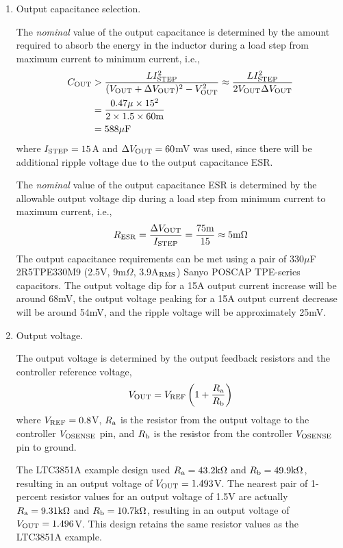 \begin{enumerate}
\item Output capacitance selection.

The {\em nominal} value of the output capacitance is determined by 
the amount required to absorb the energy in the inductor during a
load step from maximum current to minimum current, i.e.,
%
\begin{equation}
\begin{split}
C_{\rm OUT} &> \frac{LI_{\rm STEP}^2}
{(V_{\rm OUT} + \Delta V_{\rm OUT})^2 - V_{\rm OUT}^2} 
\approx \frac{LI_{\rm STEP}^2}{2V_{\rm OUT}\Delta V_{\rm OUT}}\\
&= \frac{0.47\mu\times 15^2}{2\times1.5\times60\text{m}}\\
&= 588\mu\text{F}
\end{split}
\end{equation}
%
where $I_{\rm STEP}=15$A and $\Delta V_{\rm OUT} = 60$mV was
used, since there will be additional ripple voltage due to 
the output capacitance ESR.

The {\em nominal} value of the output capacitance ESR is determined by
the allowable output voltage dip during a load step from minimum current
to maximum current, i.e.,
%
\begin{equation}
R_{\rm ESR} = \frac{\Delta V_{\rm OUT}}{I_{\rm STEP}} = 
\frac{75\text{m}}{15} \approx 5\text{m}\Omega
\end{equation}
%
The output capacitance requirements can be met using a pair
of 330$\mu$F 2R5TPE330M9 (2.5V, 9m$\Omega$, 3.9A$_{\rm RMS}$)
Sanyo POSCAP TPE-series capacitors.
%
The output voltage dip for a 15A output current increase will
be around 68mV, the output voltage peaking for a 15A output
current decrease will be around 54mV, and the ripple
voltage will be approximately 25mV.

\item Output voltage.

The output voltage is determined by the output feedback resistors
and the controller reference voltage, 
%
\begin{equation}
V_{\rm OUT} = V_{\rm REF}\left(1+\frac{R_{\rm a}}{R_{\rm b}}\right)
\end{equation}
%
where $V_{\rm REF} = 0.8$V, $R_{\rm a}$ is the resistor from the
output voltage to the controller $V_{\rm OSENSE}$ pin, and 
$R_{\rm b}$ is the resistor from the controller $V_{\rm OSENSE}$ 
pin to ground.

The LTC3851A example design used $R_{\rm a} = 43.2\text{k}\Omega$ and 
$R_{\rm b} = 49.9\text{k}\Omega$, resulting in an output
voltage of $V_{\rm OUT} = 1.493$V.
%
The nearest pair of 1-percent resistor values for an output voltage
of 1.5V are actually $R_{\rm a} = 9.31\text{k}\Omega$ and 
$R_{\rm b} = 10.7\text{k}\Omega$, resulting in an output
voltage of $V_{\rm OUT} = 1.496$V.
%
This design retains the same resistor values as the LTC3851A example.


\end{enumerate}
